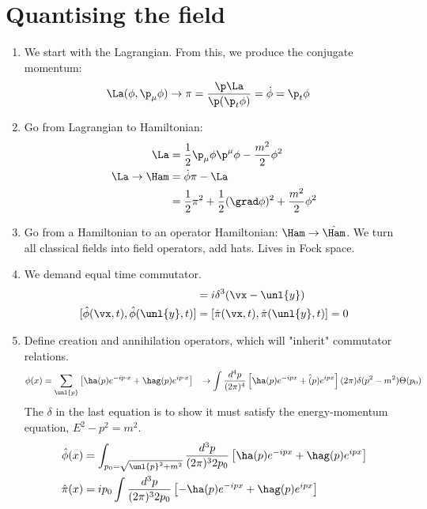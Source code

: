 \documentclass[a4paper, 11pt, normalem]{report}
\newcommand\hphi{\hat{\phi}}
\newcommand\hpi{\hat{\pi}}
\newcommand\vy{\unl{y}}
\begin{document}
\section{Quantising the field}
\begin{enumerate}
    \item We start with the Lagrangian.
        From this, we produce the conjugate momentum:
        \begin{align}
            \La(\phi,\p_\mu\phi) \to \pi &= \frac{\p\La}{\p(\p_t\phi)} = \dot{\phi} = \p_t\phi
        \end{align}
    \item Go from Lagrangian to Hamiltonian:
        \begin{align}
            \La &= \frac12 \p_\mu\phi\p^\mu\phi - \frac{m^2}{2}\phi^2 \\
            \La \to \Ham &= \dot{\phi}\pi - \La \\
                        &= \frac12\pi^2 + \frac12(\grad\phi)^2 + \frac{m^2}{2}\phi^2
        \end{align}
    \item Go from a Hamiltonian to an operator Hamiltonian: $\Ham \to \hat{\Ham}$. 
        We turn all classical fields into field operators, add hats. 
        Lives in Fock space.
    \item We demand equal time commutator. 
        \begin{align}
            [\hphi(\vx,t),\hpi(\vy,t)] &= i\delta^3(\vx-\vy) \\
            [\hphi(\vx,t),\hphi(\vy,t)] &= [\hpi(\vx,t),\hpi(\vy,t)] = 0 
        \end{align}
    \item Define creation and annihilation operators, which will "inherit" commutator relations. 
        \begin{align}
            \phi(x) &= \sum_{\unl{p}} \left[\ha(p)e^{-ip\cdot x} + \hag(p)e^{ip\cdot x}\right]
                    &\to \int \frac{d^4p}{(2\pi)^4} \left[\ha(p)e^{-ipx} + \hat(p)e^{ipx}\right](2\pi)\delta(p^2-m^2)\Theta(p_0)
        \end{align}
        The $\delta$ in the last equation is to show it must satisfy the energy-momentum equation, $E^2 - p^2 = m^2$.
        \begin{align}
            \hphi(x) &= \int_{p_0=\sqrt{\unl{p}^2+m^2}} \frac{d^3p}{(2\pi)^32p_0} \left[\ha(p)e^{-ipx} + \hag(p)e^{ipx}\right] \\
            \hpi(x) &= ip_0\int \frac{d^3p}{(2\pi)^32p_0} \left[-\ha(p)e^{-ipx} + \hag(p)e^{ipx}\right] \\

\end{align}
\end{enumerate}
\end{document}
